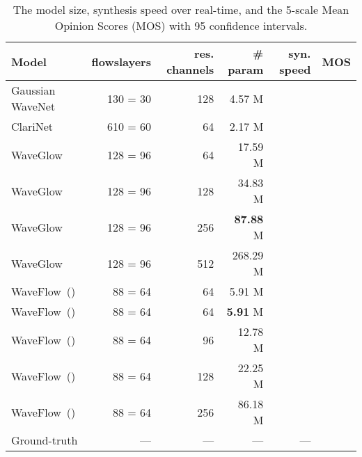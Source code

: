 \documentclass{article}
\newcommand{\NA}{---}
\begin{document}
\begin{table*}[t!]
\centering
\caption{The model size, synthesis speed over real-time, and the 5-scale Mean Opinion Scores (MOS) with 95 confidence intervals. }
\vspace{0.2em}
\begin{tabular}{l|r|r|r|r|c}
\hline 
\textbf{Model}  & \textbf{flowslayers} & \textbf{res. channels} & \textbf{\# param} & \textbf{syn. speed} & \textbf{MOS}
\\ \hline
Gaussian WaveNet & 130 = 30  & 128 \qquad &  {4.57} M & \qquad &    \\ 
ClariNet & 610 = 60  & 64 \qquad &  2.17 M & \qquad &    \\ 
WaveGlow & 128 = 96   & {64} \qquad & 17.59 M & \qquad &    \\ 
WaveGlow & 128 = 96  & 128 \qquad & 34.83 M & \qquad &       \\ 
WaveGlow & 128 = 96  & {256} \qquad & {\bf 87.88} M & \qquad &    \\ 
WaveGlow & 128 = 96  & 512 \qquad & 268.29 M & \qquad  &   \\ 
WaveFlow~() & 88 = 64 & 64 \qquad & 5.91 M &   \qquad &    \\ 
WaveFlow~() & 88 = 64 & {64} \qquad & {\bf 5.91} M &  
\qquad &    \\ 
WaveFlow~() & 88 = 64 &  96 \qquad & 12.78 M &  \qquad &    \\ 
WaveFlow~() & 88 = 64  & 128 \qquad & 22.25 M &  
\qquad &   \\ 
WaveFlow~() & 88 = 64 & {256} \qquad  & {86.18} M  &  
\qquad  &    \\ \hline
Ground-truth & \NA \qquad & \NA\qquad & \NA \qquad & \NA \qquad &    \\ \hline
\end{tabular}
\vspace{-.1cm}
\label{tab:mos_speech}
\end{table*}
\end{document}
